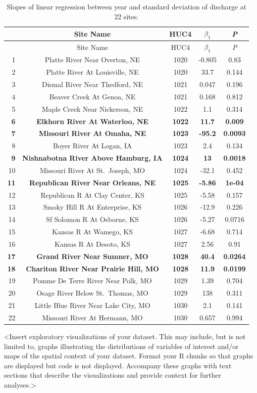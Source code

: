 \documentclass[12pt,]{article}
\begin{document}
\begin{longtable}[]{@{}rcccc@{}}
\caption{Slopes of linear regression between year and standard deviation
of discharge at 22 sites.}\tabularnewline
\toprule
~ & Site Name & HUC4 & \(\beta_1\) & \emph{P}\tabularnewline
\midrule
\endfirsthead
\toprule
~ & Site Name & HUC4 & \(\beta_1\) & \emph{P}\tabularnewline
\midrule
\endhead
1 & Platte River Near Overton, NE & 1020 & -0.805 & 0.83\tabularnewline
2 & Platte River At Louisville, NE & 1020 & 33.7 & 0.144\tabularnewline
3 & Dismal River Near Thedford, NE & 1021 & 0.047 & 0.196\tabularnewline
4 & Beaver Creek At Genoa, NE & 1021 & 0.168 & 0.812\tabularnewline
5 & Maple Creek Near Nickerson, NE & 1022 & 1.1 & 0.314\tabularnewline
\textbf{6} & \textbf{Elkhorn River At Waterloo, NE} & \textbf{1022} &
\textbf{11.7} & \textbf{0.009}\tabularnewline
\textbf{7} & \textbf{Missouri River At Omaha, NE} & \textbf{1023} &
\textbf{-95.2} & \textbf{0.0093}\tabularnewline
8 & Boyer River At Logan, IA & 1023 & 2.4 & 0.134\tabularnewline
\textbf{9} & \textbf{Nishnabotna River Above Hamburg, IA} &
\textbf{1024} & \textbf{13} & \textbf{0.0018}\tabularnewline
10 & Missouri River At St.~Joseph, MO & 1024 & -32.1 &
0.452\tabularnewline
\textbf{11} & \textbf{Republican River Near Orleans, NE} & \textbf{1025}
& \textbf{-5.86} & \textbf{1e-04}\tabularnewline
12 & Republican R At Clay Center, KS & 1025 & -5.58 &
0.157\tabularnewline
13 & Smoky Hill R At Enterprise, KS & 1026 & -12.9 &
0.226\tabularnewline
14 & Sf Solomon R At Osborne, KS & 1026 & -5.27 & 0.0716\tabularnewline
15 & Kansas R At Wamego, KS & 1027 & -6.68 & 0.714\tabularnewline
16 & Kansas R At Desoto, KS & 1027 & 2.56 & 0.91\tabularnewline
\textbf{17} & \textbf{Grand River Near Sumner, MO} & \textbf{1028} &
\textbf{40.4} & \textbf{0.0264}\tabularnewline
\textbf{18} & \textbf{Chariton River Near Prairie Hill, MO} &
\textbf{1028} & \textbf{11.9} & \textbf{0.0199}\tabularnewline
19 & Pomme De Terre River Near Polk, MO & 1029 & 1.39 &
0.704\tabularnewline
20 & Osage River Below St.~Thomas, MO & 1029 & 138 &
0.311\tabularnewline
21 & Little Blue River Near Lake City, MO & 1030 & 2.1 &
0.141\tabularnewline
22 & Missouri River At Hermann, MO & 1030 & 0.657 & 0.994\tabularnewline
\bottomrule
\end{longtable}

\textless{}Insert exploratory visualizations of your dataset. This may
include, but is not limited to, graphs illustrating the distributions of
variables of interest and/or maps of the spatial context of your
dataset. Format your R chunks so that graphs are displayed but code is
not displayed. Accompany these graphs with text sections that describe
the visualizations and provide context for further
analyses.\textgreater{}
\end{document}
